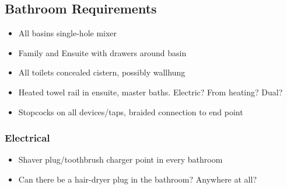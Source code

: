 \subsection{Bathroom Requirements}
\begin{itemize}
\item All basins single-hole mixer
\item Family and Ensuite with drawers around basin
\item All toilets concealed cistern, possibly wallhung
\item Heated towel rail in ensuite, master baths. Electric? From heating? Dual?
\item Stopcocks on all devices/taps, braided connection to end point    
\end{itemize}

\subsubsection{Electrical}
\begin{itemize}
\item Shaver plug/toothbrush charger point in every bathroom
\item Can there be a hair-dryer plug in the bathroom? Anywhere at all?
\end{itemize}

